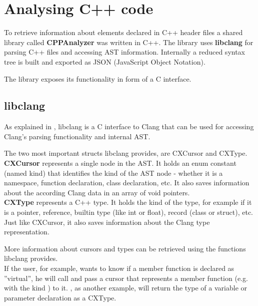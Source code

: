 \chapter{Analysing C++ code}
\label{chap:AnalysingCPP}

To retrieve information about elements declared in C++ header files a shared library called \textbf{CPPAnalyzer} was written in C++. The library uses \textbf{libclang} for parsing C++ files and accessing AST information. Internally a reduced syntax tree is built and exported as JSON (JavaScript Object Notation).

The library exposes its functionality in form of a C interface.


\section{libclang}

As explained in , libclang is a C interface to Clang that can be used for accessing Clang's parsing functionality and internal AST.


The two most important structs libclang provides, are CXCursor and CXType.
\\\textbf{CXCursor} represents a single node in the AST. It holds an enum constant (named kind) that identifies the kind of the AST node - whether it is a namespace, function declaration, class declaration, etc. It also saves information about the according Clang data in an array of void pointers.
\\\textbf{CXType} represents a C++ type. It holds the kind of the type, for example if it is a pointer, reference, builtin type (like int or float), record (class or struct), etc. Just like CXCursor, it also saves information about the Clang type representation.

More information about cursors and types can be retrieved using the functions libclang provides.
\\If the user, for example, wants to know if a member function is declared as ''virtual'', he will call  and pass a cursor that represents a member function (e.g. with the kind ) to it. , as another example, will return the type of a variable or parameter declaration as a CXType.

